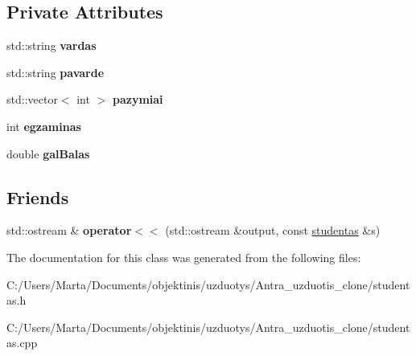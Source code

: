 \subsection*{Private Attributes}
\begin{DoxyCompactItemize}
\item 
\mbox{\label{classstudentas_a404d536f9a640c9b21f03e6f941cf76e}} 
std\+::string {\bfseries vardas}
\item 
\mbox{\label{classstudentas_add7821e642b5d26d68672f7a2a7b32cd}} 
std\+::string {\bfseries pavarde}
\item 
\mbox{\label{classstudentas_a5a91ecee087cb23f0731586fcd662c74}} 
std\+::vector$<$ int $>$ {\bfseries pazymiai}
\item 
\mbox{\label{classstudentas_a628d6ee378f28d3fa3bdb84d95642c2b}} 
int {\bfseries egzaminas}
\item 
\mbox{\label{classstudentas_a3d489c3509b6f5422fd0c75181c31cf7}} 
double {\bfseries gal\+Balas}
\end{DoxyCompactItemize}
\subsection*{Friends}
\begin{DoxyCompactItemize}
\item 
\mbox{\label{classstudentas_af8a3f13df24a4944124f75273a08e397}} 
std\+::ostream \& {\bfseries operator$<$$<$} (std\+::ostream \&output, const \mbox{\hyperlink{classstudentas}{studentas}} \&s)
\end{DoxyCompactItemize}


The documentation for this class was generated from the following files\+:\begin{DoxyCompactItemize}
\item 
C\+:/\+Users/\+Marta/\+Documents/objektinis/uzduotys/\+Antra\+\_\+uzduotis\+\_\+clone/studentas.\+h\item 
C\+:/\+Users/\+Marta/\+Documents/objektinis/uzduotys/\+Antra\+\_\+uzduotis\+\_\+clone/studentas.\+cpp\end{DoxyCompactItemize}
